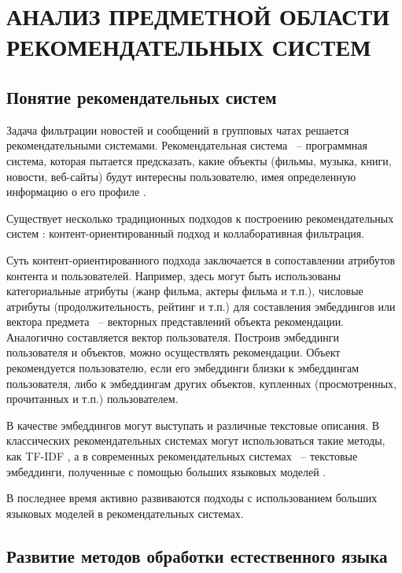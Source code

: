 \chapter{АНАЛИЗ ПРЕДМЕТНОЙ ОБЛАСТИ РЕКОМЕНДАТЕЛЬНЫХ СИСТЕМ}
\label{chap:analysis}
\aftertitle

\section{Понятие рекомендательных систем}

Задача фильтрации новостей и сообщений в групповых чатах решается рекомендательными системами. Рекомендательная система ~--  программная система, которая пытается предсказать, какие объекты (фильмы, музыка, книги, новости, веб-сайты) будут интересны пользователю, имея определенную информацию о его профиле \cite{recommendation_system_wiki}.

Существует несколько традиционных подходов к построению рекомендательных систем \cite{recommendation_system_methods}: контент-ориентированный подход и коллаборативная фильтрация.

Суть контент-ориентированного подхода заключается в сопоставлении атрибутов контента и пользователей. Например, здесь могут быть использованы категориальные атрибуты (жанр фильма, актеры фильма и т.п.), числовые атрибуты (продолжительность, рейтинг и т.п.) для составления эмбеддингов или вектора предмета ~-- векторных представлений объекта рекомендации. Аналогично составляется вектор пользователя. Построив эмбеддинги пользователя и объектов, можно осуществлять рекомендации. Объект рекомендуется пользователю, если его эмбеддинги близки к эмбеддингам пользователя, либо к эмбеддингам других объектов, купленных (просмотренных, прочитанных и т.п.) пользователем.

В качестве эмбеддингов могут выступать и различные текстовые описания. В классических рекомендательных системах могут использоваться такие методы, как TF-IDF \cite{no-patterns}, а в современных рекомендательных системах ~-- текстовые эмбеддинги, полученные с помощью больших языковых моделей \cite{tf_augumenting_recommendation}.

В последнее время активно развиваются подходы с использованием больших языковых моделей в рекомендательных системах.

\section{Развитие методов обработки естественного языка}


